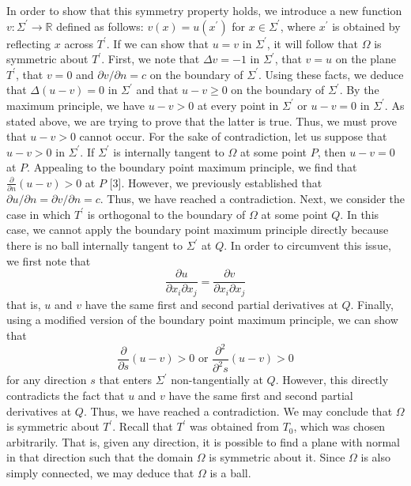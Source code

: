 \documentclass[20pt,,margin=1in,innermargin=-4.5in,blockverticalspace=-0.25in]{tikzposter}
\begin{document}
\begin{columns}
{    In order to show that this symmetry property holds, we introduce a new function $v: \Sigma^\prime \rightarrow \mathbb{R}$ defined as follows: $v(x) = u(x^\prime)$ for $x \in \Sigma^\prime$, where $x^\prime$ is obtained by reflecting $x$ across $T^\prime$. If we can show that $u = v$ in $\Sigma^\prime$, it will follow that $\Omega$ is symmetric about $T^\prime$. First, we note that $\Delta v = -1$ in $\Sigma^\prime$, that $v = u$ on the plane $T^\prime$, that $v = 0$ and $\partial{v}/\partial{n} = c$ on the boundary of $\Sigma^\prime$. Using these facts, we deduce that $\Delta(u-v) = 0$ in $\Sigma^\prime$ and that $u-v \geq 0$ on the boundary of $\Sigma^\prime$. By the maximum principle, we have $u - v > 0$ at every point in $\Sigma^\prime$ or $u-v = 0$ in $\Sigma^\prime$. As stated above, we are trying to prove that the latter is true. Thus, we must prove that $u-v > 0$ cannot occur. For the sake of contradiction, let us suppose that $u - v > 0$ in $\Sigma^\prime$. If $\Sigma^\prime$ is internally tangent to $\Omega$ at some point $P$, then $u - v = 0$ at $P$. Appealing to the boundary point maximum principle, we find that $\frac{\partial}{\partial{n}}(u-v) > 0$ at $P$ [3]. However, we previously established that $\partial{u}/\partial{n} = \partial{v}/\partial{n} = c$. Thus, we have reached a contradiction. Next, we consider the case in which $T^\prime$ is orthogonal to the boundary of $\Omega$ at some point $Q$. In this case, we cannot apply the boundary point maximum principle directly because there is no ball internally tangent to $\Sigma^\prime$ at $Q$. In order to circumvent this issue, we first note that
$$
\frac{\partial{u}}{\partial{x_i}\partial{x_j}} = \frac{\partial{v}}{\partial{x_i}\partial{x_j}}
$$ that is, $u$ and $v$ have the same first and second partial derivatives at $Q$. Finally, using a modified version of the boundary point maximum principle, we can show that
\[
\frac{\partial}{\partial{s}} (u-v) > 0 \text{ or } \frac{\partial^2}{\partial^2{s}}(u-v) > 0
\] for any direction $s$ that enters $\Sigma^\prime$ non-tangentially at $Q$. However, this directly contradicts the fact that $u$ and $v$ have the same first and second partial derivatives at $Q$. Thus, we have reached a contradiction. We may conclude that $\Omega$ is symmetric about $T^\prime$. Recall that $T^\prime$ was obtained from $T_0$, which was chosen arbitrarily. That is, given any direction, it is possible to find a plane with normal in that direction such that the domain $\Omega$ is symmetric about it. Since $\Omega$ is also simply connected, we may deduce that $\Omega$ is a ball.

}
\end{columns}
\end{document}
